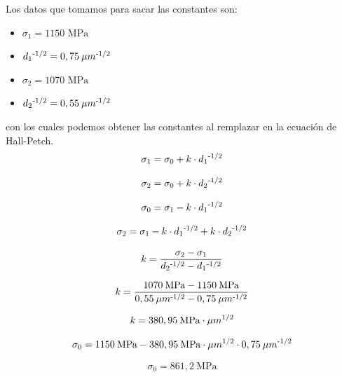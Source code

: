 \documentclass[12pt,a4paper]{article}
\begin{document}
Los datos que tomamos para sacar las constantes son:
\begin{itemize}
    \item\(\sigma_1=1150\text{ MPa}\)
    \item\(d_1 \textsuperscript{-1/2}=0,75\: \mu m\textsuperscript{-1/2}\)
    \item\(\sigma_2=1070\text{ MPa}\)
    \item\(d_2 \textsuperscript{-1/2}=0,55\: \mu m\textsuperscript{-1/2}\)
\end{itemize}

con los cuales podemos obtener las constantes al remplazar en la ecuación de Hall-Petch.
\begin{equation}
    \sigma_1 = \sigma_0 +k\cdot d_1 \textsuperscript{-1/2}
\end{equation}

\begin{equation}
    \sigma_2 = \sigma_0 +k\cdot d_2 \textsuperscript{-1/2}
\end{equation}

\begin{equation}
    \sigma_0 = \sigma_1 -k\cdot d_1 \textsuperscript{-1/2}
\end{equation}

\begin{equation}
    \sigma_2 = \sigma_1 -k\cdot d_1 \textsuperscript{-1/2} +k\cdot d_2 \textsuperscript{-1/2}
\end{equation}

\begin{equation}
    k = \frac{\sigma_2 - \sigma_1}{d_2 \textsuperscript{-1/2} - d_1 \textsuperscript{-1/2}}
\end{equation}

\begin{equation}
    k = \frac{1070\: \text{MPa} - 1150\: \text{MPa}}{{0,55\: \mu m\textsuperscript{-1/2}} - 0,75\: \mu m\textsuperscript{-1/2}}
\end{equation}

\begin{equation}
    k = 380,95\: \text{MPa}\cdot \mu m\textsuperscript{1/2}
\end{equation}

\begin{equation}
    \sigma_0 = 1150\: \text{MPa} - 380,95\: \text{MPa}\cdot \mu m\textsuperscript{1/2} \cdot 0,75\: \mu m\textsuperscript{-1/2}
\end{equation}

\begin{equation}
    \sigma_0 = 861,2\: \text{MPa} 
\end{equation}
\end{document}
